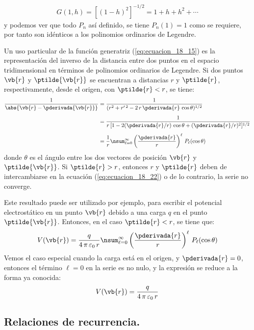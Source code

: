 \begin{align*}
G(1, h) = [(1 - h)^{2}]^{-1/2} =  1 + h + h^{2} + \cdots
\end{align*}
y podemos ver que todo $P_{n}$ así definido, se tiene $P_{n} (1) = 1$ como se requiere, por tanto son idénticos a los polinomios ordinarios de Legendre.
\par
Un uso particular de la función generatriz (\ref{eq:ecuacion_18_15}) es la representación del inverso de la distancia entre dos puntos en el espacio tridimensional en términos de polinomios ordinarios de Legendre. Si dos puntos $\vb{r}$ y $\ptilde{\vb{r}}$ se encuentran a distancias $r$ y $\ptilde{r}$, respectivamente, desde el origen, con $\ptilde{r} < r$, se tiene:
\begin{align}
\begin{aligned}[b]
\dfrac{1}{\abs{\vb{r} - \pderivada{\vb{r}}}} &= \dfrac{1}{(r^{2} + r^{\prime \: 2} - 2 \, r \, \pderivada{r} \, \cos \theta)^{1/2}} \\[0.5em]
&= \dfrac{1}{r \, [ 1 -2 (\pderivada{r}/r) \, \cos \theta + (\pderivada{r}/r)^{2}]^{1/2}} \\[0.5em]
&= \dfrac{1}{r} \nsum_{\ell = 0}^{\infty} \left( \dfrac{\pderivada{r}}{r} \right)^{\ell} \, P_{\ell} (\cos \theta)
\end{aligned}
\label{eq:ecuacion_18_22}
\end{align}
donde $\theta$ es el ángulo entre los dos vectores de posición $\vb{r}$ y $\ptilde{\vb{r}}$. Si $\ptilde{r} > r$, entonces $r$ y $\ptilde{r}$ deben de intercambiarse en la ecuación (\ref{eq:ecuacion_18_22}) o de lo contrario, la serie no converge.
\par
Este resultado puede ser utilizado por ejemplo, para escribir el potencial electrostático en un punto $\vb{r}$ debido a una carga $q$ en el punto $\ptilde{\vb{r}}$. Entonces, en el caso $\ptilde{r} < r$, se tiene que:
\begin{align*}
V(\vb{r}) = \dfrac{q}{4 \, \pi \, \varepsilon_{0} \, r} \nsum_{\ell=0}^{\infty} \left( \dfrac{\pderivada{r}}{r} \right)^{\ell} \, P_{\ell} (\cos \theta)
\end{align*}
Vemos el caso especial cuando la carga está en el origen, y $\pderivada{r} = 0$, entonces el término $\ell =0$ en la serie es no nulo, y la expresión se reduce a la forma ya conocida:
\begin{align*}
V(\vb{r}) = \dfrac{q}{4 \, \pi \, \varepsilon_{0} \, r}
\end{align*}

\subsection{Relaciones de recurrencia.}

